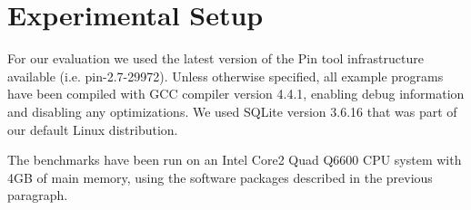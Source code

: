 \section{Experimental Setup}
For our evaluation we used the latest version of the Pin tool
infrastructure available (i.e. pin-2.7-29972). Unless otherwise
specified, all example programs have been compiled with GCC compiler
version 4.4.1, enabling debug information and disabling any
optimizations. We used SQLite version 3.6.16 that was part of our
default Linux distribution.

The benchmarks have been run on an Intel Core2 Quad Q6600 CPU system
with 4GB of main memory, using the software packages described in the
previous paragraph.
